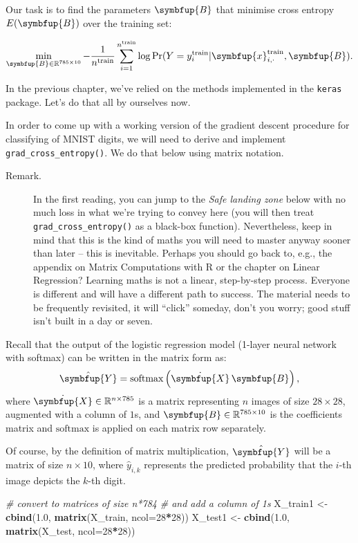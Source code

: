\documentclass[10pt,b5paper,krantz1]{krantz}
\newenvironment{Shaded}{\begin{snugshade}}{\end{snugshade}}
\newcommand{\CommentTok}[1]{\textcolor[rgb]{0.37,0.37,0.37}{\textit{#1}}}
\newcommand{\DataTypeTok}[1]{\textcolor[rgb]{0.27,0.27,0.27}{#1}}
\newcommand{\DecValTok}[1]{\textcolor[rgb]{0.06,0.06,0.06}{#1}}
\newcommand{\FloatTok}[1]{\textcolor[rgb]{0.06,0.06,0.06}{#1}}
\newcommand{\KeywordTok}[1]{\textcolor[rgb]{0.27,0.27,0.27}{\textbf{#1}}}
\newcommand{\NormalTok}[1]{#1}
\newcommand{\OperatorTok}[1]{\textcolor[rgb]{0.43,0.43,0.43}{\textbf{#1}}}
\newcommand{\StringTok}[1]{\textcolor[rgb]{0.5,0.5,0.5}{#1}}
\renewcommand{\mathbf}[1]{\symbfup{#1}}
\begin{document}
Our task is to find the parameters \(\mathbf{B}\)
that minimise cross entropy \(E(\mathbf{B})\) over the training set:

\[
\min_{\mathbf{B}\in\mathbb{R}^{785\times 10}}
-\frac{1}{n^\text{train}} \sum_{i=1}^{n^\text{train}}
\log \Pr(Y=y_i^\text{train}|\mathbf{x}_{i,\cdot}^\text{train},\mathbf{B}).
\]

In the previous chapter, we've relied on the methods implemented
in the \texttt{keras} package. Let's do that all by ourselves now.

In order to come up with a working version of the gradient
descent procedure for classifying of MNIST digits,
we will need to derive and implement \texttt{grad\_cross\_entropy()}.
We do that below using matrix notation.

\begin{description}
\item[Remark.]
In the first reading, you can jump to the \emph{Safe landing zone}
below with no much loss in what we're trying to convey here
(you will then treat \texttt{grad\_cross\_entropy()} as a black-box function).
Nevertheless, keep in mind that this is the kind of maths you
will need to master anyway sooner than later -- this is inevitable.
Perhaps you should go back to, e.g., the appendix on Matrix Computations
with R or the chapter on Linear Regression? Learning maths is not a linear,
step-by-step process. Everyone is different and will have a different
path to success. The material needs to be frequently revisited,
it will ``click''
someday, don't you worry; good stuff isn't built in a day or seven.
\end{description}

Recall that the output of the logistic regression model
(1-layer neural network with softmax) can be written
in the matrix form as:
\[
\hat{\mathbf{Y}}=\mathrm{softmax}\left(
\dot{\mathbf{X}}\,\mathbf{B}
\right),
\]
where
\(\dot{\mathbf{X}}\in\mathbb{R}^{n\times 785}\) is a matrix
representing \(n\) images of size \(28\times 28\), augmented with a column of \(1\)s,
and
\(\mathbf{B}\in\mathbb{R}^{785\times 10}\) is the coefficients matrix
and \(\mathrm{softmax}\) is applied on each matrix row separately.

Of course, by the definition of matrix multiplication,
\(\hat{\mathbf{Y}}\) will be a matrix of size
\(n\times 10\), where \(\hat{y}_{i,k}\) represents the predicted probability
that the \(i\)-th image depicts the \(k\)-th digit.

\begin{Shaded}
\begin{Highlighting}[]
\CommentTok{# convert to matrices of size n*784}
\CommentTok{# and add a column of 1s}
\NormalTok{X_train1 <-}\StringTok{ }\KeywordTok{cbind}\NormalTok{(}\FloatTok{1.0}\NormalTok{, }\KeywordTok{matrix}\NormalTok{(X_train, }\DataTypeTok{ncol=}\DecValTok{28}\OperatorTok{*}\DecValTok{28}\NormalTok{))}
\NormalTok{X_test1  <-}\StringTok{ }\KeywordTok{cbind}\NormalTok{(}\FloatTok{1.0}\NormalTok{, }\KeywordTok{matrix}\NormalTok{(X_test, }\DataTypeTok{ncol=}\DecValTok{28}\OperatorTok{*}\DecValTok{28}\NormalTok{))}
\end{Highlighting}
\end{Shaded}
\end{document}
